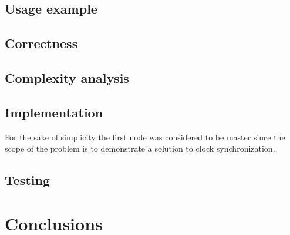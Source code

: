 \documentclass[12pt]{article}
\begin{document}
\subsection{Usage example}

\subsection{Correctness}

\subsection{Complexity analysis}

\subsection{Implementation}

For the sake of simplicity the first node was considered to be master since the scope of the problem is to demonstrate a solution to clock synchronization.



\subsection{Testing}

\section{Conclusions}

\printbibliography
\end{document}
